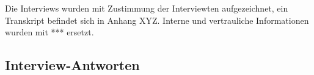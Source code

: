 Die Interviews wurden mit Zustimmung der Interviewten aufgezeichnet, ein Transkript befindet sich in Anhang XYZ.
Interne und vertrauliche Informationen wurden mit *** ersetzt.

\subsection{Interview-Antworten}
